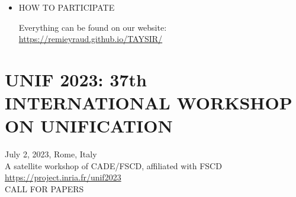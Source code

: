 \documentclass[prodmode,acmtecs]{acmsmall} %
\begin{document}
\begin{itemize}
\item  HOW TO PARTICIPATE 
 
  Everything can be found on our website: \href{https://remieyraud.github.io/TAYSIR/}{https://remieyraud.github.io/TAYSIR/}  
 
\end{itemize}\section{UNIF 2023: 37th INTERNATIONAL WORKSHOP ON UNIFICATION}\label{UNIF2023}  July 2, 2023, Rome, Italy\\ 
  A satellite workshop of CADE/FSCD, affiliated with FSCD\\ 
  \href{https://project.inria.fr/unif2023}{https://project.inria.fr/unif2023}\\ 
CALL FOR PAPERS 
\end{document}
